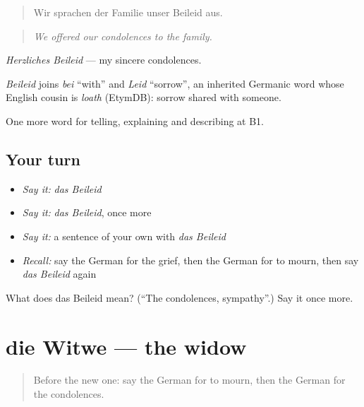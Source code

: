 \begin{quote}
Wir sprachen der Familie unser Beileid aus.
\end{quote}

\begin{quote}
\emph{We offered our condolences to the family.}
\end{quote}

\emph{Herzliches Beileid} — my sincere condolences.

\begin{cousinweb}
\emph{Beileid} joins \emph{bei} \textquotedblleft{}with\textquotedblright{} and \emph{Leid} \textquotedblleft{}sorrow\textquotedblright{}, an inherited Germanic word whose English cousin is \emph{loath} (EtymDB): sorrow shared with someone.
\end{cousinweb}

\begin{grammarlens}[title={What you've built}]
One more word for telling, explaining and describing at B1.
\end{grammarlens}

\subsection*{Your turn}
\begin{itemize}
\raggedright
  \item \emph{Say it:} \emph{das Beileid}
  \item \emph{Say it:} \emph{das Beileid}, once more
  \item \emph{Say it:} a sentence of your own with \emph{das Beileid}
  \item \emph{Recall:} say the German for the grief, then the German for to mourn, then say \emph{das Beileid} again
\end{itemize}

\begin{tcolorbox}[breakable,colback=teal!4,colframe=teal!35!black,title={Before you move on}]
What does das Beileid mean? (\textquotedblleft{}The condolences, sympathy\textquotedblright{}.) Say it once more.
\end{tcolorbox}
\section[die Witwe]{die Witwe — the widow}

\label{lesson:GE-C304-witwe}



\begin{quote}
Before the new one: say the German for to mourn, then the German for the condolences.
\end{quote}

